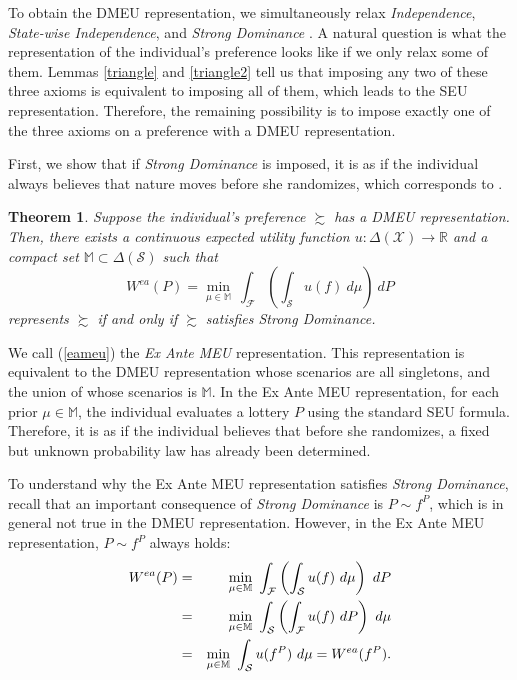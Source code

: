 \documentclass[12pt, notitlepage]{article}
\newtheorem{theorem}{Theorem}
\begin{document}
To obtain the DMEU representation, we simultaneously relax \textit{%
Independence}, \textit{State-wise Independence}, and \textit{Strong Dominance%
}. A natural question is what the representation of the individual's
preference looks like if we only relax some of them. Lemmas \ref{triangle}
and \ref{triangle2} tell us that imposing any two of these three axioms is
equivalent to imposing all of them, which leads to the SEU representation.
Therefore, the remaining possibility is to impose exactly one of the three
axioms on a preference with a DMEU representation.

First, we show that if \textit{Strong Dominance} is imposed, it is as if the
individual always believes that nature moves before she randomizes, which
corresponds to \cite{Raiffa61}.

\begin{theorem}
\label{ead}Suppose the individual's preference $\succsim $ has a DMEU
representation. Then, there exists a continuous expected utility function $%
u:\Delta (\mathcal{X})\rightarrow \mathbb{R}$ and a compact set $\mathbb{M}%
\subset \Delta (\mathcal{S})$ such that%
\begin{equation}
W^{ea}(P)=\underset{\mu \in \mathbb{M}}{\min }~\int_{\mathcal{F}}\left(
\int_{\mathcal{S}}u(f)~d\mu \right) ~dP  \label{eameu}
\end{equation}%
represents $\succsim $ if and only if $\succsim $ satisfies Strong Dominance.
\end{theorem}

We call (\ref{eameu}) the \textit{Ex Ante MEU} representation. This
representation is equivalent to the DMEU representation whose scenarios are
all singletons, and the union of whose scenarios is $\mathbb{M}$. In the Ex
Ante MEU representation, for each prior $\mu \in \mathbb{M}$, the individual
evaluates a lottery $P$ using the standard SEU formula. Therefore, it is as
if the individual believes that before she randomizes, a fixed but unknown
probability law has already been determined.

To understand why the Ex Ante MEU representation satisfies \textit{Strong
Dominance}, recall that an important consequence of \textit{Strong Dominance}
is $P\sim f^{P}$, which is in general not true in the DMEU representation.
However, in the Ex Ante MEU representation, $P\sim f^{P}$ always holds:%
\begin{eqnarray*}
W^{ea}(P) &=&\underset{\mu \in \mathbb{M}}{\min }~\int_{\mathcal{F}}\left(
\int_{\mathcal{S}}u(f)~d\mu \right) ~dP \\
&=&\underset{\mu \in \mathbb{M}}{\min }~\int_{\mathcal{S}}\left( \int_{%
\mathcal{F}}u(f)~dP\right) ~d\mu \\
&=&\underset{\mu \in \mathbb{M}}{\min }~\int_{\mathcal{S}}u(f^{P})~d\mu
=W^{ea}(f^{P}).
\end{eqnarray*}
\end{document}
